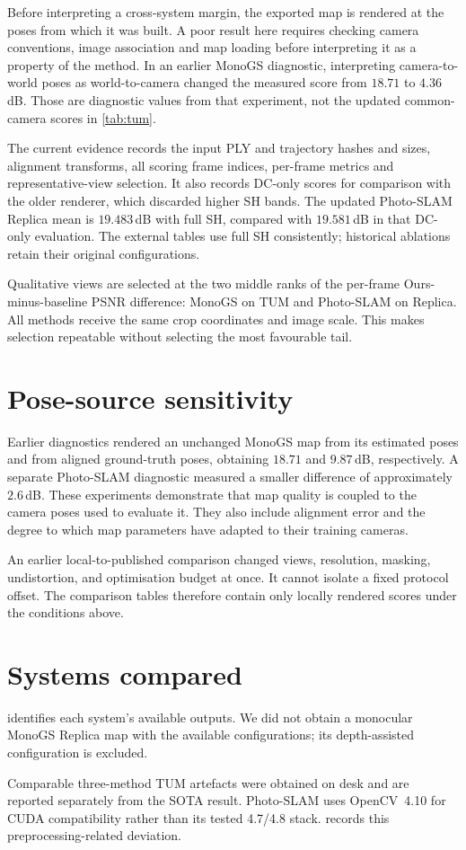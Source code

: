 Before interpreting a cross-system margin, the exported map is rendered at
the poses from which it was built. A poor result here requires checking
camera conventions, image association and map loading before interpreting
it as a property of the method. In an earlier MonoGS diagnostic, interpreting
camera-to-world poses as world-to-camera changed the measured score from
$18.71$ to $4.36$\,dB. Those are diagnostic values from that experiment,
not the updated common-camera scores in \cref{tab:tum}.

The current evidence records the input PLY and trajectory hashes and sizes,
alignment transforms, all scoring frame indices, per-frame metrics and
representative-view selection. It also records DC-only scores for comparison
with the older renderer, which discarded higher SH bands. The updated
Photo-SLAM Replica mean is $19.483$\,dB with full SH, compared with
$19.581$\,dB in that DC-only evaluation. The external tables use full SH
consistently; historical ablations retain their original configurations.

Qualitative views are selected at the two middle ranks of the per-frame
Ours-minus-baseline PSNR difference: MonoGS on TUM and Photo-SLAM on Replica.
All methods receive the same crop coordinates and image scale. This makes
selection repeatable without selecting the most favourable tail.

\section{Pose-source sensitivity}
\label{sec:protocol:offset}

Earlier diagnostics rendered an unchanged MonoGS map from its estimated
poses and from aligned ground-truth poses, obtaining $18.71$ and
$9.87$\,dB, respectively. A separate Photo-SLAM diagnostic measured a
smaller difference of approximately $2.6$\,dB. These experiments demonstrate
that map quality is coupled to the camera poses used to evaluate it.
They also include alignment error and the degree to which map parameters
have adapted to their training cameras.

An earlier local-to-published comparison changed views, resolution, masking,
undistortion, and optimisation budget at once. It cannot isolate a fixed
protocol offset. The comparison tables therefore contain only locally
rendered scores under the conditions above.

\section{Systems compared}
\label{sec:protocol:systems}

 identifies each system's available outputs.
We did not obtain a monocular MonoGS Replica map with the available
configurations; its depth-assisted configuration is excluded.

Comparable three-method TUM artefacts were obtained on desk and are reported
separately from the SOTA result. Photo-SLAM uses
OpenCV~4.10 for CUDA compatibility rather than its tested 4.7/4.8 stack.
 records this preprocessing-related deviation.
